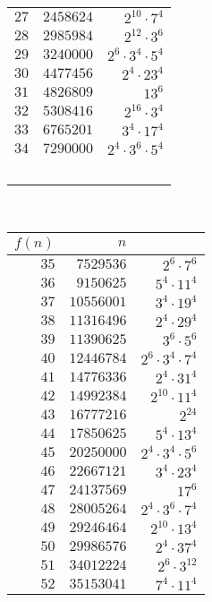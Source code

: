 \begin{center}
\begin{tabular} {|rr|r}
 $27$ &  $2458624$ &           $2^{10}\cdot7^{4}$ \\
 $28$ &  $2985984$ &           $2^{12}\cdot3^{6}$ \\
 $29$ &  $3240000$ &  $2^{6}\cdot3^{4}\cdot5^{4}$ \\
 $30$ &  $4477456$ &           $2^{4}\cdot23^{4}$ \\
 $31$ &  $4826809$ &                     $13^{6}$ \\
 $32$ &  $5308416$ &           $2^{16}\cdot3^{4}$ \\
 $33$ &  $6765201$ &           $3^{4}\cdot17^{4}$ \\
 $34$ &  $7290000$ &  $2^{4}\cdot3^{6}\cdot5^{4}$ \\
 ~&~&~
\end{tabular}
~~~~~
\begin{tabular} {|rr|r}
$f(n)$ & $n$ &  \\ \hline
 $35$ &  $7529536$ &            $2^{6}\cdot7^{6}$ \\
 $36$ &  $9150625$ &           $5^{4}\cdot11^{4}$ \\
 $37$ & $10556001$ &           $3^{4}\cdot19^{4}$ \\
 $38$ & $11316496$ &           $2^{4}\cdot29^{4}$ \\
 $39$ & $11390625$ &            $3^{6}\cdot5^{6}$ \\
 $40$ & $12446784$ &  $2^{6}\cdot3^{4}\cdot7^{4}$ \\
 $41$ & $14776336$ &           $2^{4}\cdot31^{4}$ \\
 $42$ & $14992384$ &          $2^{10}\cdot11^{4}$ \\
 $43$ & $16777216$ &                     $2^{24}$ \\
 $44$ & $17850625$ &           $5^{4}\cdot13^{4}$ \\
 $45$ & $20250000$ &  $2^{4}\cdot3^{4}\cdot5^{6}$ \\
 $46$ & $22667121$ &           $3^{4}\cdot23^{4}$ \\
 $47$ & $24137569$ &                     $17^{6}$ \\
 $48$ & $28005264$ &  $2^{4}\cdot3^{6}\cdot7^{4}$ \\
 $49$ & $29246464$ &          $2^{10}\cdot13^{4}$ \\
 $50$ & $29986576$ &           $2^{4}\cdot37^{4}$ \\
 $51$ & $34012224$ &           $2^{6}\cdot3^{12}$ \\
 $52$ & $35153041$ &           $7^{4}\cdot11^{4}$ \\

\end{tabular}
\end{center}
